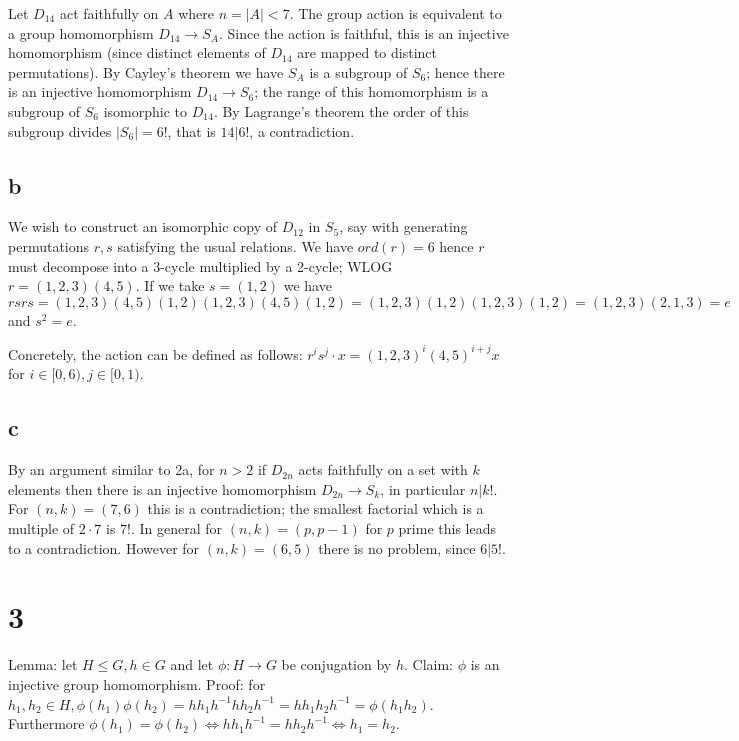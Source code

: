 \documentclass{article}
\def\inv{{-1}}
\begin{document}
Let $D_{14}$ act faithfully on $A$ where $n = |A| < 7$. The group action is equivalent to a group homomorphism $D_{14} \to S_A$. Since the action is faithful, this is an injective homomorphism (since distinct elements of $D_{14}$ are mapped to distinct permutations). By Cayley's theorem we have $S_A$ is a subgroup of $S_6$; hence there is an injective homomorphism $D_{14} \to S_6$; the range of this homomorphism is a subgroup of $S_6$ isomorphic to $D_{14}$. By Lagrange's theorem the order of this subgroup divides $|S_6| = 6!$, that is $14 | 6!$, a contradiction.

\subsection*{b}

We wish to construct an isomorphic copy of $D_{12}$ in $S_5$, say with generating permutations $r, s$ satisfying the usual relations. We have $ord(r) = 6$ hence $r$ must decompose into a 3-cycle multiplied by a 2-cycle; WLOG $r = (1,2,3)(4, 5)$. If we take $s = (1, 2)$ we have $rsrs = (1,2,3)(4, 5)(1, 2)(1,2,3)(4, 5)(1, 2) = (1,2,3)(1,2)(1,2,3)(1,2) = (1,2,3)(2,1,3) = e$ and $s^2 = e$.

Concretely, the action can be defined as follows: $r^i s^j \cdot x = (1, 2, 3)^i(4, 5)^{i+j}x$ for $i \in [0, 6), j \in [0, 1)$.

\subsection*{c}

By an argument similar to 2a, for $n > 2$ if $D_{2n}$ acts faithfully on a set with $k$ elements then there is an injective homomorphism $D_{2n} \to S_k$, in particular $n | k!$. For $(n, k) = (7, 6)$ this is a contradiction; the smallest factorial which is a multiple of $2 \cdot 7$ is $7!$. In general for $(n, k) = (p, p-1)$ for $p$ prime this leads to a contradiction. However for $(n, k) = (6, 5)$ there is no problem, since $6 | 5!$.

\section*{3}

Lemma: let $H \le G, h \in G$ and let $\phi: H \to G$ be conjugation by $h$. Claim: $\phi$ is an injective group homomorphism. Proof: for $h_1, h_2 \in H, \phi(h
_1)\phi(h_2) = hh_1h^\inv hh_2h^\inv = hh_1h_2h^\inv = \phi(h_1 h_2)$. Furthermore $\phi(h_1) = \phi(h_2) \iff hh_1h^\inv = hh_2h^\inv \iff h_1 = h_2$.
\end{document}
